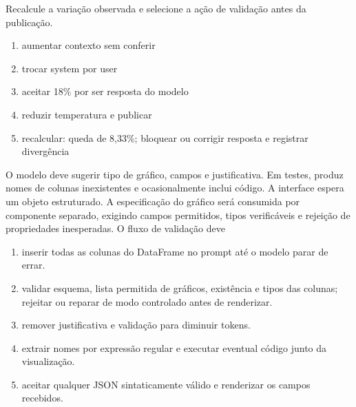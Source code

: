 \documentclass[12pt,a4paper]{article}
\begin{document}
\FonteDidatica

\Comando Recalcule a variação observada e selecione a ação de validação antes da publicação.

\begin{enumerate}[label=\Alph*)]
  \item aumentar contexto sem conferir
  \item trocar system por user
  \item aceitar 18\% por ser resposta do modelo
  \item reduzir temperatura e publicar
  \item recalcular: queda de 8,33\%; bloquear ou corrigir resposta e registrar divergência
\end{enumerate}

\TextoBase
O modelo deve sugerir tipo de gráfico, campos e justificativa. Em testes, produz nomes de colunas inexistentes e ocasionalmente inclui código. A interface espera um objeto estruturado.
A especificação do gráfico será consumida por componente separado, exigindo campos permitidos, tipos verificáveis e rejeição de propriedades inesperadas.
\FonteDidatica
\Comando O fluxo de validação deve
\begin{enumerate}[label=\Alph*)]
  \item inserir todas as colunas do DataFrame no prompt até o modelo parar de errar.
  \item validar esquema, lista permitida de gráficos, existência e tipos das colunas; rejeitar ou reparar de modo controlado antes de renderizar.
  \item remover justificativa e validação para diminuir tokens.
  \item extrair nomes por expressão regular e executar eventual código junto da visualização.
  \item aceitar qualquer JSON sintaticamente válido e renderizar os campos recebidos.
\end{enumerate}
\end{document}
